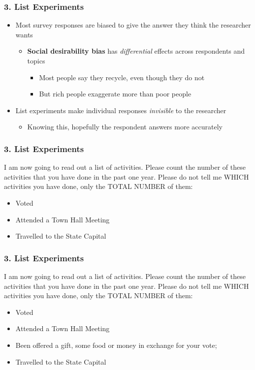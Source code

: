 \documentclass[xcolor=x11names,compress]{beamer}\usepackage[]{graphicx}\usepackage[]{color}
\renewcommand{\(}{\begin{columns}}
\renewcommand{\)}{\end{columns}}
\newcommand{\<}[1]{\begin{column}{#1}}
\renewcommand{\>}{\end{column}}
\begin{document}
\begin{frame}
\frametitle{3. List Experiments}
\begin{itemize}
\item Most survey responses are biased to give the answer they think the researcher wants
\pause
\begin{itemize}
\item \textbf{Social desirability bias} has \textit{differential} effects across respondents and topics
\begin{itemize}
\item Most people say they recycle, even though they do not
\pause
\item But rich people exaggerate more than poor people
\end{itemize}
\pause
\end{itemize}
\item List experiments make individual responses \textit{invisible} to the researcher
\pause
\begin{itemize}
\item Knowing this, hopefully the respondent answers more accurately
\end{itemize}
\end{itemize}
\end{frame}

\begin{frame}
\frametitle{3. List Experiments}
I am now going to read out a list of activities. Please count the number of these activities that you have done in the past one year. Please do not tell me WHICH activities you have done, only the TOTAL NUMBER of them: 
\begin{itemize}
\item Voted
\item Attended a Town Hall Meeting
\item Travelled to the State Capital
\end{itemize}
\end{frame}

\begin{frame}
\frametitle{3. List Experiments}
 I am now going to read out a list of activities. Please count the number of these activities that you have done in the past one year. Please do not tell me WHICH activities you have done, only the TOTAL NUMBER of them:
\begin{itemize}
\item Voted
\item Attended a Town Hall Meeting
\item Been offered a gift, some food or money in exchange for your vote; 
\item Travelled to the State Capital
\end{itemize}
\end{frame}
\end{document}
